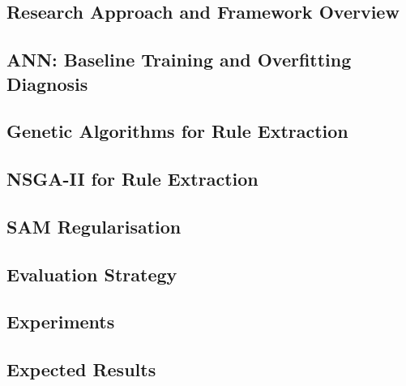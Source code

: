 
\subsection{Research Approach and Framework Overview}


\subsection{ANN: Baseline Training and Overfitting Diagnosis}


\subsection{Genetic Algorithms for Rule Extraction}


\subsection{NSGA-II for Rule Extraction}


\subsection{SAM Regularisation}


\subsection{Evaluation Strategy}


\subsection{Experiments}


\subsection{Expected Results}
